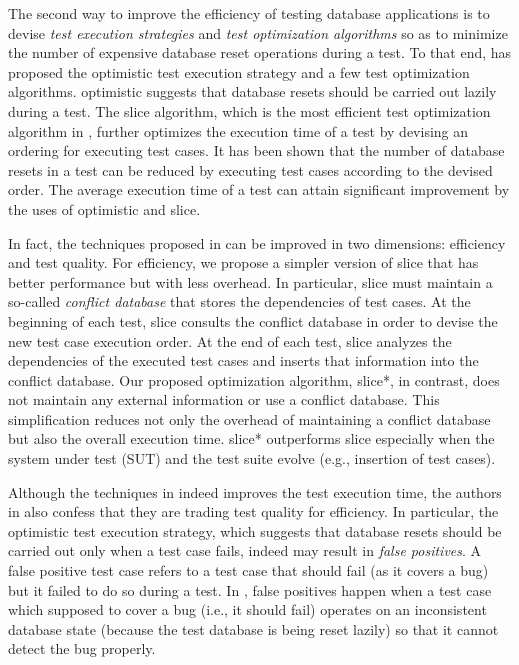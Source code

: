 \documentclass[authoryear,preprint,12pt]{elsarticle}
\begin{document}
The second way to improve the efficiency of testing database applications
is to devise \emph{test execution strategies} and \emph{test optimization algorithms} 
so as to minimize the number of expensive database reset operations during a test.
To that end, \cite{cidr05} has proposed the {\sc optimistic} test execution strategy and
a few test optimization algorithms.
{\sc optimistic} suggests that database resets should be carried out lazily during a test.
The {\sc slice} algorithm, which is the most efficient test optimization algorithm in \cite{cidr05}, 
further optimizes the execution time of a test by devising an ordering for executing test cases.
It has been shown that the number of database resets in a test can be reduced
by executing test cases according to the devised order.
The average execution time of a test 
can attain significant improvement by the uses of {\sc optimistic} and {\sc slice}.

In fact, the techniques proposed in \cite{cidr05} can be improved in two dimensions: efficiency and test quality.
For efficiency, we propose a simpler version of {\sc slice} that has better performance but with less overhead.
In particular, {\sc slice} must maintain a so-called \emph{conflict database} that stores the dependencies of test cases.
At the beginning of each test, {\sc slice} consults the conflict database in order to devise the new test case execution order.
At the end of each test, {\sc slice} analyzes the dependencies of the executed test cases
and inserts that information into the conflict database.
Our proposed optimization algorithm, {\sc slice*}, in contrast, does not maintain any external information or use a conflict database.
This simplification reduces not only the overhead of maintaining a conflict database
but also the overall execution time.
{\sc slice*} outperforms {\sc slice} especially when
the system under test (SUT) and the test suite evolve (e.g., insertion of test cases).

Although the techniques in \cite{cidr05} indeed improves the test execution time,
the authors in \cite{cidr05} also confess that they are trading test quality for efficiency.
In particular, the {\sc optimistic} test execution strategy, which suggests that database resets should be carried out only 
when a test case fails, indeed may result in \emph{false positives}.
A false positive test case refers to a test case that should fail (as it covers a bug) but it failed to do so during a test.
In \cite{cidr05}, false positives happen when 
a test case which supposed to cover a bug (i.e., it should fail) operates on an inconsistent database state
(because the test database is being reset lazily) so that it cannot detect the bug properly.
\end{document}
